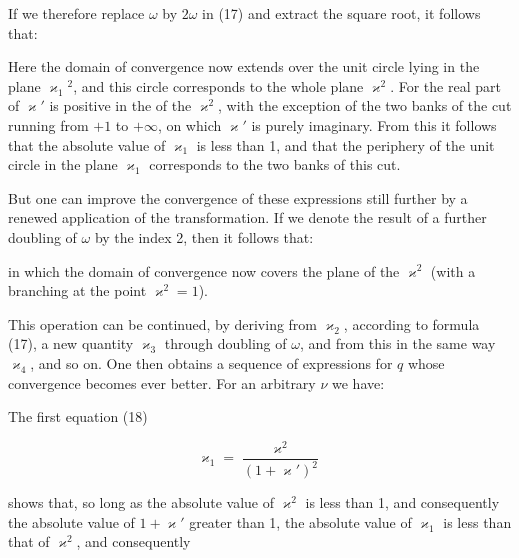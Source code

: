 
If we therefore replace $\omega$ by $2\omega$ in (17) and extract the square root, it follows that:


Here the domain of convergence now extends over the unit circle lying in the plane $\varkappa_1{}^2$, and this circle corresponds to the whole plane $\varkappa^2$. For the real part of $\varkappa'$ is positive in the  of the $\varkappa^2$, with the exception of the two banks of the cut running from $+1$ to $+\infty$, on which $\varkappa'$ is purely imaginary. From this it follows that the absolute value of $\varkappa_1$ is less than 1, and that the periphery of the unit circle in the plane $\varkappa_1$ corresponds to the two banks of this cut.

But one can improve the convergence of these expressions still further by a renewed application of the  transformation. If we denote the result of a further doubling of $\omega$ by the index 2, then it follows that:


in which the domain of convergence now covers the plane of the $\varkappa^2$  (with a branching at the point $\varkappa^2=1$).

This operation can be continued, by deriving from $\varkappa_2$, according to formula (17), a new quantity $\varkappa_3$ through doubling of $\omega$, and from this in the same way $\varkappa_4$, and so on. One then obtains a sequence of expressions for $q$ whose convergence becomes ever better. For an arbitrary $\nu$ we have:


The first equation (18)

\[
\varkappa_1 = \frac{\varkappa^2}{(1+\varkappa')^2}
\]

shows that, so long as the absolute value of $\varkappa^2$ is less than 1, and consequently the absolute value of $1+\varkappa'$ greater than 1, the absolute value of $\varkappa_1$ is less than that of $\varkappa^2$, and consequently
